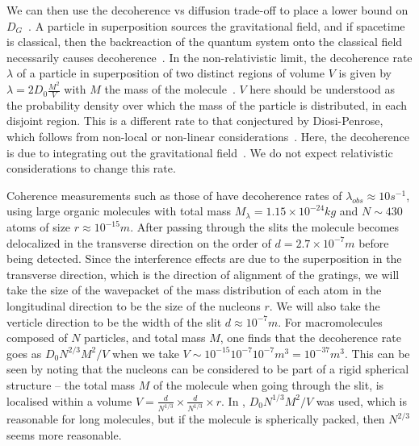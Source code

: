 \documentclass[aps,preprintnumbers,superscriptaddress,longbibliography]{revtex4-1}
\begin{document}
We can then use the decoherence vs diffusion trade-off to place a lower bound on $D_G$~\cite{oppenheim2022gravitationally}. A particle in superposition sources the gravitational field, and if spacetime is classical, then the backreaction of the quantum system onto the classical field necessarily causes decoherence~\cite{hall2005interacting,tilloy2016sourcing,poulinKITP,oppenheim2018post}. 
 In the non-relativistic limit,  the decoherence rate $\lambda$ of a particle in superposition of %
two distinct regions of 
volume $V$ is given  by $\lambda=2D_0\frac{M^2}{V}$ with $M$ the mass of the molecule~\cite{oppenheim2022gravitationally}. $V$ here should be understood as the probability density over which the mass of the particle is distributed, in each disjoint region. This is a different rate to that conjectured by Diosi-Penrose, which follows from non-local or non-linear considerations~\cite{diosi1987universal,penrose1998quantum}. Here, the decoherence is due to integrating out the gravitational field~\cite{layton2022semi}. We do not expect relativistic considerations to change this rate. 



Coherence measurements such as those of \cite{Gerlich2011} have decoherence rates of $\lambda_{obs}\approx 10\unit{s}^{-1}$, using large organic molecules with total mass $M_{\lambda} = 1.15 \times 10^{-24}kg$ and $N \sim 430$ atoms of size $r\approx 10^{-15}m$. After passing through the slits the molecule becomes delocalized in the transverse direction on the order of $d=2.7\times 10^{-7}m$ before being detected. Since the interference effects are due to the superposition in the transverse direction, which is the direction of alignment of the gratings, we will take the size of the wavepacket of the mass distribution of each atom in the longitudinal direction to be the size of the nucleons $r$. We will also take the verticle direction to be the width of the slit $d\approx 10^{-7} \unit{m}$. %
For macromolecules composed of $N$ particles, and total mass $M$, one finds that the decoherence rate goes as $D_0N^{2/3}M^2/V$ when we take $V \sim 10^{-15} 10^{-7} 10^{-7}m^3 = 10^{-37}m^3$. This can be seen by noting that the nucleons can be considered to be part of a rigid spherical structure -- the total mass $M$ of the molecule when going through the slit, is localised within a volume $V=\frac{d}{N^{1/3}}\times\frac{d}{N^{1/3}}\times r$.
In \cite{oppenheim2022gravitationally}, $D_0N^{1/3}M^2/V$ was used, which is reasonable for long molecules, but if the molecule is spherically packed, then $N^{2/3}$ seems more reasonable.
\end{document}
